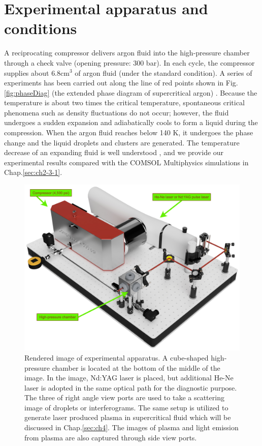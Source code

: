 \section{Experimental apparatus and conditions}
\label{sec:ch2-2}

A reciprocating compressor delivers argon fluid into the high-pressure chamber through a check valve (opening pressure: 300 bar). In each cycle, the compressor supplies about $6.8\text{cm}^3$ of argon fluid (under the standard condition). A series of experiments has been carried out along the line of red points shown in Fig.\ref{fig:phaseDiag} (the extended phase diagram of supercritical argon) \cite{linstorm2020nist, banuti2017similarity}. Because the temperature is about two times the critical temperature, spontaneous critical phenomena such as density fluctuations do not occur; however, the fluid undergoes a sudden expansion and adiabatically cools to form a liquid during the compression. When the argon fluid reaches below 140 K, it undergoes the phase change and the liquid droplets and clusters are generated. The temperature decrease of an expanding fluid is well understood \cite{hagena1981nucleation, chen2009pressure, tao2016revisiting}, and we provide our experimental results compared with the COMSOL Multiphysics simulations in Chap.\ref{sec:ch2-3-1}.

\begin{figure}[ht!]
\centering
\includegraphics[width=130mm]{figures/ch2/setup/render.pdf}
\caption{Rendered image of experimental apparatus. A cube-shaped high-pressure chamber is located at the bottom of the middle of the image. In the image, Nd:YAG laser is placed, but additional He-Ne laser is adopted in the same optical path for the diagnostic purpose. The three of right angle view ports are used to take a scattering image of droplets or interferograms. The same setup is utilized to generate laser produced plasma in supercritical fluid which will be discussed in Chap.\ref{sec:ch4}. The images of plasma and light emission from plasma are also captured through side view ports.}
\label{fig:render}
\end{figure}

